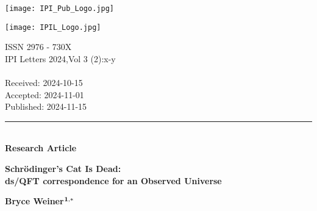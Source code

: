 \documentclass[11pt,english,twoside]{article}
\theoremstyle{plain}
\theoremstyle{definition}
\theoremstyle{remark}
\newcommand{\dS}{{\rm dS}}
\begin{document}
\thispagestyle{empty}
\setcounter{page}{25}

\pagestyle{fancy}
\fancyhf{}
\fancyhead{}
\fancyfoot{}
\fancyfoot[LE,RO]{\thepage}
\renewcommand{\headrulewidth}{0.4pt} %


\begin{minipage}{0.14\textwidth}
\texttt{[image: IPI\_Pub\_Logo.jpg]} %
\end{minipage}
\hfill
\begin{minipage}{0.5\textwidth}
\texttt{[image: IPIL\_Logo.jpg]}
\end{minipage}
\begin{minipage}{0.3\textwidth}
\begin{flushright}
{\scriptsize %
ISSN 2976 - 730X\\
IPI Letters 2024,Vol 3 (2):x-y\\
\href{https://doi.org/10.59973/ipil.xx}{\color{blue}{https://doi.org/10.59973/ipil.xx}}\\
\medskip
Received: 2024-10-15\\
Accepted: 2024-11-01\\
Published: 2024-11-15\\
}\end{flushright}
\end{minipage}


\vspace{0.5cm}

\par\noindent\rule{\textwidth}{0.5pt}\\
{\color{red}\textbf{Research Article}} %

\begin{center}
\vspace{0.5cm}
  {\huge {\bf Schr\"odinger's Cat Is Dead: \\ ds/QFT correspondence for an Observed Universe}}

  \vspace{0.5cm}
  
\end{center}

\noindent
{\large {\bf Bryce Weiner$^\bold{1,*}$} }
\end{document}
